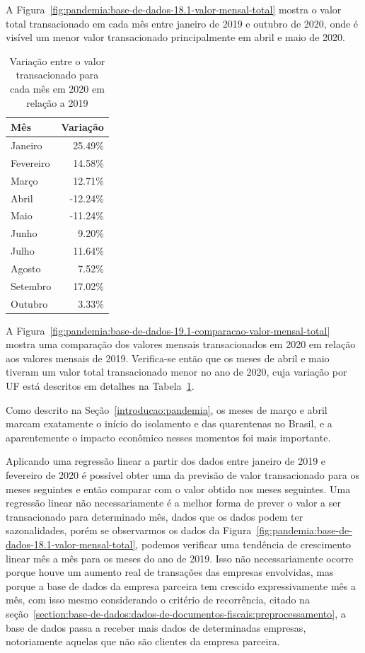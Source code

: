 A Figura~\ref{fig:pandemia:base-de-dados-18.1-valor-mensal-total} mostra o valor total transacionado em cada mês entre janeiro de 2019 e outubro de 2020, onde é visível um menor valor transacionado principalmente em abril e maio de 2020.

\begin{table}[htb]
\centering
\caption{Variação entre o valor transacionado para cada mês em 2020 em relação a 2019}
\label{tab:comparacao-valor-mensal-total}
\begin{tabular}{lr}
\toprule
Mês & Variação \\
\midrule
Janeiro &   25.49\% \\
Fevereiro & 14.58\% \\
Março &     12.71\% \\
Abril &    -12.24\% \\
Maio &     -11.24\% \\
Junho &      9.20\% \\
Julho &     11.64\% \\
Agosto &     7.52\% \\
Setembro &  17.02\% \\
Outubro &    3.33\% \\
\bottomrule
\end{tabular}
\fdadospesquisa
\end{table}

A Figura~\ref{fig:pandemia:base-de-dados-19.1-comparacao-valor-mensal-total} mostra uma comparação dos valores mensais transacionados em 2020 em relação aos valores mensais de 2019. Verifica-se então que os meses de abril e maio tiveram um valor total transacionado menor no ano de 2020, cuja variação por UF está descritos em detalhes na Tabela~\ref{tab:comparacao-valor-mensal-total}.

Como descrito na Seção~\ref{introducao:pandemia}, os meses de março e abril marcam exatamente o início do isolamento e das quarentenas no Brasil, e a aparentemente o impacto econômico nesses momentos foi mais importante.

Aplicando uma regressão linear a partir dos dados entre janeiro de 2019 e fevereiro de 2020 é possível obter uma da previsão de valor transacionado para os meses seguintes e então comparar com o valor obtido nos meses seguintes. Uma regressão linear não necessariamente é a melhor forma de prever o valor a ser transacionado para determinado mês, dados que os dados podem ter sazonalidades, porém se observarmos os dados da Figura~\ref{fig:pandemia:base-de-dados-18.1-valor-mensal-total}, podemos verificar uma tendência de crescimento linear mês a mês para os meses do ano de 2019. Isso não necessariamente ocorre porque houve um aumento real de transações das empresas envolvidas, mas porque a base de dados da empresa parceira tem crescido expressivamente mês a mês, com isso mesmo considerando o critério de recorrência, citado na seção~\ref{section:base-de-dados:dados-de-documentos-fiscais:preprocessamento}, a base de dados passa a receber mais dados de determinadas empresas, notoriamente aquelas que não são clientes da empresa parceira.

